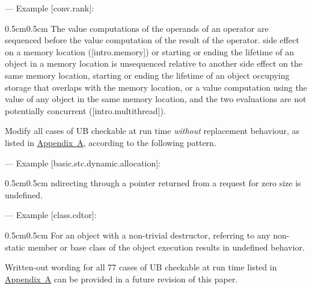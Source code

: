 {--- Example [conv.rank]:

\begin{adjustwidth}{0.5cm}{0.5cm}
The value computations of the operands of an operator are sequenced before the value computation of the result of the operator.   side effect on a memory location ([intro.memory]) or starting or ending the lifetime of an object in a memory location is unsequenced relative to another side effect on the same memory location, starting or ending the lifetime of an object occupying storage that overlaps with the memory location, or a value computation using the value of any object in the same memory location, and the two evaluations are not potentially concurrent ([intro.multithread]).
\end{adjustwidth}

Modify all cases of UB checkable at run time \emph{without} replacement behaviour, as listed in \hyperref[appendix]{Appendix~A}, according to the following pattern. 

--- Example [basic.stc.dynamic.allocation]:

\begin{adjustwidth}{0.5cm}{0.5cm}
ndirecting through a pointer  returned from a request for zero size is undefined.
\end{adjustwidth}

--- Example [class.cdtor]:

\begin{adjustwidth}{0.5cm}{0.5cm}
For an object with a non-trivial destructor, referring to any non-static member or base class of the object  execution results in undefined behavior.
\end{adjustwidth}

Written-out wording for all 77 cases of UB checkable at run time listed in \hyperref[appendix]{Appendix~A} can be provided in a future revision of this paper.


}

